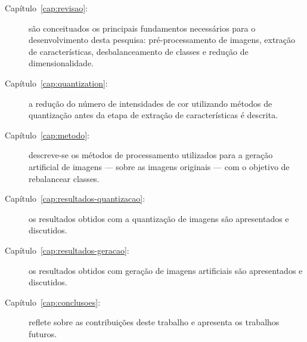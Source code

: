 \begin{description}
\item [Capítulo~\ref{cap:revisao}:] são conceituados os principais fundamentos necessários para o desenvolvimento desta pesquisa: pré-processamento de imagens, extração de características, desbalanceamento de classes e redução de dimensionalidade.

\item [Capítulo~\ref{cap:quantization}:] a redução do número de intensidades de cor utilizando métodos de quantização antes da etapa de extração de características é descrita.

\item [Capítulo~\ref{cap:metodo}:] descreve-se os métodos de processamento utilizados para a geração artificial de imagens --- sobre as imagens originais --- com o objetivo de rebalancear classes.

\item [Capítulo~\ref{cap:resultados-quantizacao}:] os resultados obtidos com a quantização de imagens são apresentados e discutidos.

\item [Capítulo~\ref{cap:resultados-geracao}:] os resultados obtidos com geração de imagens artificiais são apresentados e discutidos.

\item [Capítulo~\ref{cap:conclusoes}:] reflete sobre as contribuições deste trabalho e apresenta os trabalhos futuros.

\end{description}
